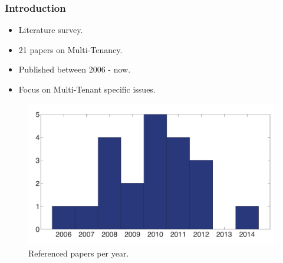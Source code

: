 \documentclass{beamer}
\begin{document}
\begin{frame}\frametitle{\textbf{\LARGE{\textrm{Introduction}}}}
	\begin{itemize}
		\item Literature survey.
		\item 21 papers on Multi-Tenancy.
		\item Published between 2006 - now.
		\item Focus on Multi-Tenant specific issues.
	\end{itemize}
	\begin{figure}[H]
		\centering
		\includegraphics[width=.6\columnwidth]{../assets/papers.pdf}
		\vspace{-10pt}
		\caption{Referenced papers per year.}
	\end{figure}
\end{frame}
\end{document}
